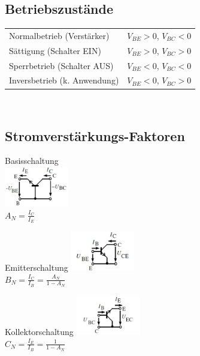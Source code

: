 	\begin{multicols}{2}
	\subsection{Betriebszustände}
		\begin{tabular}{l l}
			Normalbetrieb (Verstärker) & $V_{BE} > 0$, $V_{BC} < 0$\\
			Sättigung (Schalter EIN) & $V_{BE} > 0$, $V_{BC} > 0$\\
			Sperrbetrieb (Schalter AUS) & $V_{BE} < 0$, $V_{BC} < 0$\\
			Inversbetrieb (k. Anwendung) & $V_{BE} < 0$, $V_{BC} > 0$
		\end{tabular} \\
	\columnbreak
	\subsection{Stromverstärkungs-Faktoren}
		\begin{minipage}[c]{2.8cm}
			Basisschaltung \\
			\includegraphics[width=2.8cm]{images/bip-basissch}\\
			$A_N=\frac{I_C}{I_E}$ \\
		\end{minipage}
		\begin{minipage}[c]{2.8cm}
			Emitterschaltung
			\includegraphics[width=2.8cm]{images/bip-emittersch}\\
			$B_N=\frac{I_C}{I_B}=\frac{A_N}{1-A_N}$ \\
		\end{minipage}
		\begin{minipage}[c]{2.8cm}
			Kollektorschaltung
			\includegraphics[width=2.8cm]{images/bip-kollektorsch}\\
			$C_N=\frac{I_E}{I_B}=\frac{1}{1-A_N}$ \\
		\end{minipage}
	\end{multicols}
	
